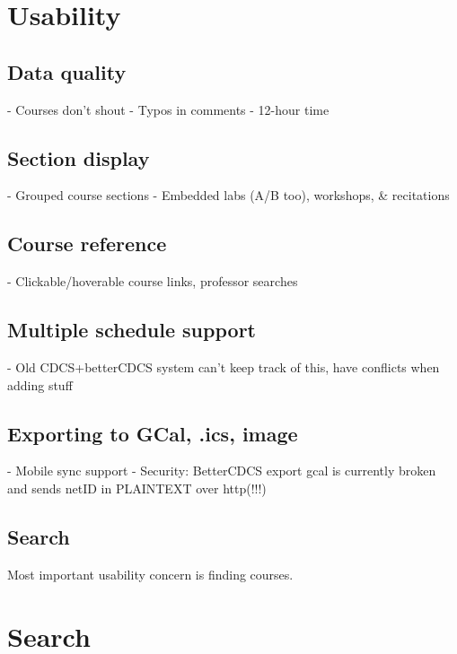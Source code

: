 
\section{Usability}

\subsection{Data quality}

- Courses don't shout
- Typos in comments
- 12-hour time

\subsection{Section display}

- Grouped course sections
- Embedded labs (A/B too), workshops, \& recitations

\subsection{Course reference}

- Clickable/hoverable course links, professor searches

\subsection{Multiple schedule support}

- Old CDCS+betterCDCS system can't keep track of this, have conflicts when adding stuff

\subsection{Exporting to GCal, .ics, image}

- Mobile sync support
- Security: BetterCDCS export gcal is currently broken and sends netID in PLAINTEXT over http(!!!)

\subsection{Search}

Most important usability concern is finding courses.


\section{Search}

